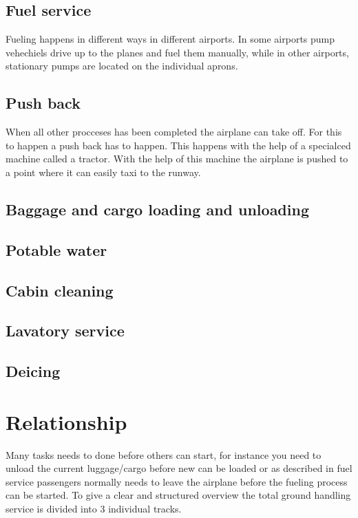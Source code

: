 \subsection{Fuel service}
Fueling happens in different ways in different airports. In some airports pump vehechiels drive up to the planes and fuel them manually, while in other airports, stationary pumps are located on the individual aprons.

\subsection{Push back}
When all other procceses has been completed the airplane can take off. For this to happen a push back has to happen. This happens with the help of a specialced machine called a tractor. With the help of this machine the airplane is pushed to a point where it can easily taxi to the runway.



\subsection{Baggage and cargo loading and unloading}
\subsection{Potable water}
\subsection{Cabin cleaning}
\subsection{Lavatory service}
\subsection{Deicing}

\section{Relationship}
Many tasks needs to done before others can start, for instance you need to unload the current luggage/cargo before new can be loaded or as described in fuel service passengers normally needs to leave the airplane before the fueling process can be started. To give a clear and structured overview the total ground handling service is divided into 3 individual tracks.
